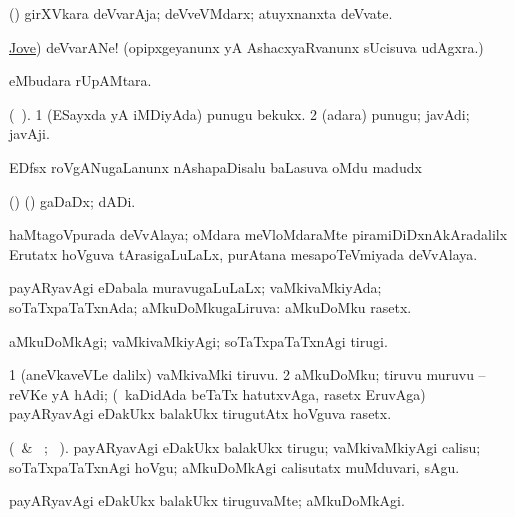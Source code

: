 \bentry
{} 
\gl{\nA}
\bmng
(\girxVpu) girXVkara deVvarAja; deVveVMdarx; atuyxnanxta deVvate.
\emng
	
\noindent
\gl{\pagu} 
\bmng
{} \hyperref{kandict_j.pdf}{J}{Jove}{Jove}) deVvarANe! (opipxgeyanunx yA AshacxyaRvanunx sUcisuva udAgxra.)
\emng
\eentry

\bentry
{} 
\gl{\nA} 
\bmng
{} eMbudara rUpAMtara.
\emng
\eentry

\bentry
{} 
\gl{\nA} 
\bmng
(\ame\ ). 
\bnum
\num{1} (ESayxda yA iMDiyAda) punugu bekukx. 
\num{2} (adara) punugu; javAdi; javAji.
\enum
\emng
\eentry

\bentry
{} 
\gl{\nA}
\bmng
EDfsx   roVgANugaLanunx nAshapaDisalu baLasuva oMdu madudx 
\emng
\eentry

\bentry
{} 
\gl{\nA}  
\bmng
(\AseTxrXV) (\ashi) gaDaDx; dADi.
\emng
\eentry

\bentry
{}  
\gl{\nA}
\bmng
haMtagoVpurada deVvAlaya; oMdara meVloMdaraMte piramiDiDxnAkAradalilx Erutatx hoVguva tArasigaLuLaLx, purAtana mesapoTeVmiyada deVvAlaya. 
\emng
\eentry

\bentry
{} 
\gl{\gu} 
\bmng
payARyavAgi eDabala muravugaLuLaLx; vaMkivaMkiyAda; soTaTxpaTaTxnAda; aMkuDoMkugaLiruva:  aMkuDoMku rasetx.
\emng
\eentry

\bentry
{} 
\gl{\kirxvi}  
\bmng
aMkuDoMkAgi; vaMkivaMkiyAgi; soTaTxpaTaTxnAgi tirugi.
\emng
\eentry

\bentry
{} 
\gl{\nA} 
\bmng
\bnum
\num{1} (aneVkaveVLe \bava dalilx) vaMkivaMki tiruvu. 
\num{2} aMkuDoMku; tiruvu muruvu -- reVKe yA hAdi; (\kanmu\ kaDidAda beTaTx hatutxvAga, rasetx  EruvAga) payARyavAgi eDakUkx balakUkx tirugutAtx hoVguva rasetx.
\enum
\emng
\eentry

\bentry
{} 
\gl{\akirx}    
\bmng
(\BU\ \& \BUkaq\ ; \vakaq\ ).
payARyavAgi eDakUkx balakUkx tirugu; vaMkivaMkiyAgi calisu; soTaTxpaTaTxnAgi hoVgu; aMkuDoMkAgi calisutatx  muMduvari, sAgu.
\emng
\eentry

\bentry
{} 
\gl{\kirxvi} 
\bmng
payARyavAgi eDakUkx balakUkx tiruguvaMte; {aMkuDoMkAgi}.
\emng
\eentry

